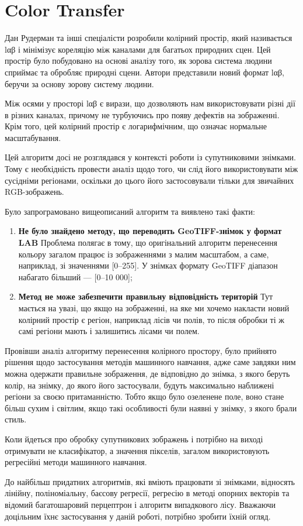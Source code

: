 \section{Color Transfer}

Дан Рудерман та інші спеціалісти розробили колірний простір, який називається
lαβ і мінімізує кореляцію між каналами для багатьох природних сцен. Цей простір
було побудовано на основі аналізу того, як зорова система
людини сприймає та обробляє природні сцени. Автори представили новий формат lαβ, беручи за основу
зорову систему людини.

Між осями у просторі lαβ є вирази, що дозволяють нам використовувати різні дії в
різних каналах, причому не турбуючись про появу дефектів на зображенні.
Крім того, цей колірний простір є логарифмічним, що означає нормальне масштабування.

Цей алгоритм досі не розглядався у контексті роботи із супутниковими знімками.
Тому є необхідність провести аналіз щодо того, чи слід його використовувати
між сусідніми регіонами, оскільки до цього його застосовували тільки для звичайних
RGB-зображень.

Було запрограмовано вищеописаний алгоритм та виявлено такі факти:

\begin{enumerate}
	\item \textbf{Не було знайдено методу, що переводить GeoTIFF-знімок у формат LAB}
		Проблема полягає в тому, що оригінальний алгоритм перенесення кольору загалом
		працює із зображеннями з малим масштабом, а саме, наприклад, зі значеннями [0--255].
		У знімках формату GeoTIFF діапазон набагато більший --- [0--10 000];

	\item \textbf{Метод не може забезпечити правильну відповідність територій}
        Тут мається на увазі, що якщо на зображенні, на яке ми хочемо накласти новий колірний
		простір є регіон, наприклад лісів чи полів, то після обробки ті ж самі
		регіони мають і залишитись лісами чи полем.
\end{enumerate}

Провівши аналіз алгоритму перенесення колірного простору, було прийнято рішення щодо
застосування методів машинного навчання, адже саме завдяки ним можна одержати
правильне зображення, де відповідно до знімка, з якого беруть колір, на
знімку, до якого його застосували, будуть максимально наближені регіони за своєю
притаманністю. Тобто якщо було озеленене поле, воно стане більш сухим і світлим,
якщо такі особливості були наявні у знімку, з якого брали стиль.

Коли йдеться про обробку супутникових зображень і потрібно на виході отримувати не
класифікатор, а значення пікселів, загалом використовують регресійні методи
машинного навчання.

До найбільш придатних алгоритмів, які вміють працювати зі знімками, відносять
лінійну, поліноміальну, баєсову регресії, регресію в методі опорних векторів та відомий
багатошаровий перцептрон і алгоритм випадкового лісу. Вважаючи доцільним їхнє
застосування у даній роботі, потрібно зробити їхній огляд.
